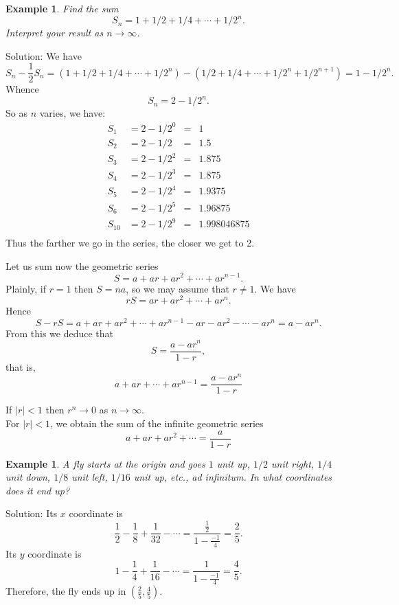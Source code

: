 \documentclass[11pt, openany]{book}
\theoremstyle{change} \theoremheaderfont{\blue\sffamily\bfseries}
\newtheorem{exa}[thm]{Example}
\theoremstyle{nonumberplain} \theoremheaderfont{\sffamily\bfseries}
\newcommand{\í}{\'{\i}}
\begin{document}
\begin{exa} Find the sum
$$ S_n = 1 + 1/2 + 1/4 + \cdots + 1/2^n.$$Interpret your result as $n \rightarrow \infty$.  \end{exa}
Solution: We have
$$ S_n - \frac{1}{2}S_n = (1 + 1/2 + 1/4 + \cdots + 1/2^n) - (1/2 + 1/4 + \cdots + 1/2^n + 1/2^{n + 1}) =
1 - 1/{2^n}.$$Whence $$ S_n = 2 - 1/2^n.$$So as $n$ varies, we
have:
$$\begin{array}{lcll}
S_1 & = 2 - 1/2^0 & = & 1 \\
S_2 & = 2 - 1/2 &  = & 1.5 \\
S_3 & = 2 - 1/2^2 & = & 1.875 \\
S_4 & = 2 - 1/2^3 & = & 1.875 \\
S_5 & = 2 - 1/2^4 & = & 1.9375 \\
S_6 & = 2 - 1/2^5 & = & 1.96875 \\
S_{10} & = 2 - 1/2^9 & = & 1.998046875 \\
\end{array}$$Thus the farther we go in the series, the closer we get to 2.




Let us sum now the geometric series
$$S = a + ar + ar^2 + \cdots + ar^{n - 1}.$$
Plainly, if $r = 1$ then $S = na$, so we may assume that $r \neq
1$. We have
$$rS = ar + ar^2 + \cdots + ar^n.$$ Hence
$$S - rS = a + ar + ar^2 + \cdots + ar^{n - 1} - ar - ar^2 - \cdots - ar^n = a - ar^n.$$
From this we deduce that $$S = \frac{a - ar^n}{1 - r},$$that is,
\begin{equation} a + ar + \cdots + ar^{n - 1} =  \frac{a - ar^n}{1 - r}
\end{equation}


If $|r| < 1$ then $r^n \rightarrow 0$ as $n \rightarrow \infty$. \\


For $|r| < 1$, we obtain the sum of the infinite geometric series
\begin{equation}  a + ar + ar^2 + \cdots   =  \frac{a}{1 - r}   \end{equation}

\begin{exa} A fly starts at the origin and goes $1$ unit up, $1/2$ unit right, $1/4$ unit down, $1/8$ unit left,
$1/16$ unit up, etc., {\em ad infinitum.} In what coordinates does
it end up?\end{exa} Solution: Its $x$ coordinate is
$$\frac{1}{2} - \frac{1}{8} + \frac{1}{32} - \cdots
= \frac{\frac{1}{2}}{1 - \frac{-1}{4}} = \frac{2}{5}.$$ Its $y$
coordinate is
$$1 - \frac{1}{4} + \frac{1}{16} - \cdots = \frac{1}{1 - \frac{-1}{4}} = \frac{4}{5}.$$Therefore, the
fly ends up in $(\frac{2}{5}, \frac{4}{5}).$
\end{document}
